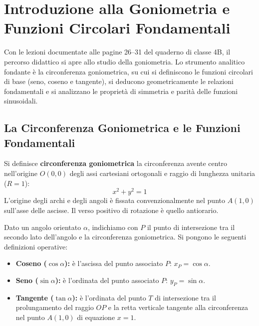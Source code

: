 \documentclass[11pt,a4paper,oneside]{report}
\begin{document}
\chapter{Introduzione alla Goniometria e Funzioni Circolari Fondamentali}

Con le lezioni documentate alle pagine 26--31 del quaderno di classe 4B, il percorso didattico si apre allo studio della goniometria. Lo strumento analitico fondante \`e la circonferenza goniometrica, su cui si definiscono le funzioni circolari di base (seno, coseno e tangente), si deducono geometricamente le relazioni fondamentali e si analizzano le propriet\`a di simmetria e parit\`a delle funzioni sinusoidali.

\section{La Circonferenza Goniometrica e le Funzioni Fondamentali}

\begin{definizione}
Si definisce \textbf{circonferenza goniometrica} la circonferenza avente centro nell'origine $O(0, 0)$ degli assi cartesiani ortogonali e raggio di lunghezza unitaria ($R = 1$):
\begin{equation}
x^2 + y^2 = 1
\end{equation}
L'origine degli archi e degli angoli \`e fissata convenzionalmente nel punto $A(1, 0)$ sull'asse delle ascisse. Il verso positivo di rotazione \`e quello antiorario.
\end{definizione}

Dato un angolo orientato $\alpha$, indichiamo con $P$ il punto di intersezione tra il secondo lato dell'angolo e la circonferenza goniometrica. Si pongono le seguenti definizioni operative:
\begin{itemize}
\item \textbf{Coseno ($\cos\alpha$):} \`e l'ascissa del punto associato $P$: $x_P = \cos\alpha$.
\item \textbf{Seno ($\sin\alpha$):} \`e l'ordinata del punto associato $P$: $y_P = \sin\alpha$.
\item \textbf{Tangente ($\tan\alpha$):} \`e l'ordinata del punto $T$ di intersezione tra il prolungamento del raggio $OP$ e la retta verticale tangente alla circonferenza nel punto $A(1, 0)$ di equazione $x = 1$.
\end{itemize}
\end{document}
